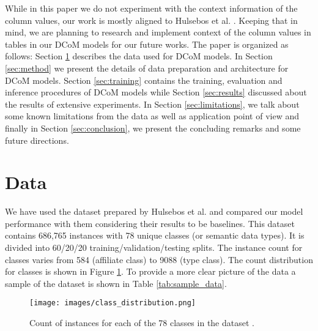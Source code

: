 \documentclass{article}
\begin{document}
While in this paper we do not experiment with the context information of the column values, our work is mostly aligned to Hulsebos et al. \cite{Hulsebos}. Keeping that in mind, we are planning to research and implement context of the column values in tables in our DCoM models for our future works. The paper is organized as follows: Section \ref{sec:data} describes the data used for DCoM models. In Section \ref{sec:method} we present the details of data preparation and architecture for DCoM models. Section \ref{sec:training} contains the training, evaluation and inference procedures of DCoM models while Section \ref{sec:results} discussed about the results of extensive experiments. In Section \ref{sec:limitations}, we talk about some known limitations from the data as well as application point of view and finally in Section \ref{sec:conclusion}, we present the concluding remarks and some future directions.

\section{Data}
\label{sec:data}

We have used the dataset prepared by Hulsebos et al. \cite{Hulsebos} and compared our model performance with them considering their results to be baselines. This dataset contains 686,765 instances with 78 unique classes (or semantic data types). It is divided into 60/20/20 training/validation/testing splits. The instance count for classes varies from 584 (affiliate class) to 9088 (type class). The count distribution for classes is shown in Figure \ref{fig:class_distribution}. To provide a more clear picture of the data a sample of the dataset is shown in Table \ref{tab:sample_data}.

\begin{figure}[ht]
	\centering
	\texttt{[image: images/class\_distribution.png]}
	\caption{Count of instances for each of the 78 classes in the dataset \cite{Hulsebos}.}
	\label{fig:class_distribution}
\end{figure}
\end{document}
